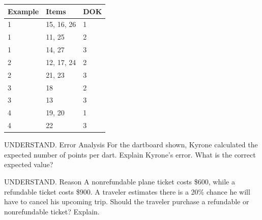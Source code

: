 \documentclass{article}
\newenvironment{item-analysis}{}{}      %
\newenvironment{practice}[2]{}{}        %
\newcommand{\answer}[1]{}               %
\newcommand{\placeholder}[2]{}          %
\newcommand{\te}[1]{}                   %
\begin{document}
\begin{item-analysis}
\begin{tabular}{lll}
\toprule
Example & Items & DOK \\
\midrule
1 & 15, 16, 26 & 1 \\
1 & 11, 25 & 2 \\
1 & 14, 27 & 3 \\
2 & 12, 17, 24 & 2 \\
2 & 21, 23 & 3 \\
3 & 18 & 2 \\
3 & 13 & 3 \\
4 & 19, 20 & 1 \\
4 & 22 & 3 \\
\bottomrule
\end{tabular}
\end{item-analysis}
\begin{practice}{11}{2}
UNDERSTAND. Error Analysis For the dartboard shown, Kyrone calculated the expected number of points per dart. Explain Kyrone's error. What is the correct expected value?
\placeholder{diagram}{Dartboard hung against brick wall: concentric circles, outer blue circle radius 7 labeled 1 POINT, inner white circle radius 2 with yellow border labeled 4 POINTS in red. Common red center; left-pointing radius to outer left edge labeled r=7 and right-pointing radius to inner right edge labeled r=2. Darts on rack lower right.}
\te{Student work with red X: Expected value ( =\frac27(4)+\frac57(1)=\frac87+\frac57=\frac{13}{7}\approx1.86).}
\answer{Kyrone incorrectly calculated the probabilities for each outcome. The area of the entire dartboard is (49\pi) and the area of the inner circle is (4\pi). So, the area of the outer region is (49\pi-4\pi=45\pi). Therefore, the probability that a dart lands in the inner circle is (\frac{4\pi}{49\pi}=\frac4{49}), the probability that it lands in the outer region is (\frac{45\pi}{49\pi}=\frac{45}{49}), and the expected value is (\frac4{49}(4)+\frac{45}{49}(1)=\frac{61}{49}\approx1.24).}
\end{practice}
\begin{practice}{12}{2}
UNDERSTAND. Reason A nonrefundable plane ticket costs \$600, while a refundable ticket costs \$900. A traveler estimates there is a 20\% chance he will have to cancel his upcoming trip. Should the traveler purchase a refundable or nonrefundable ticket? Explain.
\answer{Nonrefundable; there is a 20\% chance the man will not fly, so there is an 80\% chance he will fly. If he purchases the nonrefundable ticket, his cost is \$600 whether he flies or not. If he purchases the refundable ticket, his expected cost is ((0.8)(900)+0.2(0)=\$720). Based on expected value, he should purchase the nonrefundable ticket.}
\end{practice}
\end{document}
